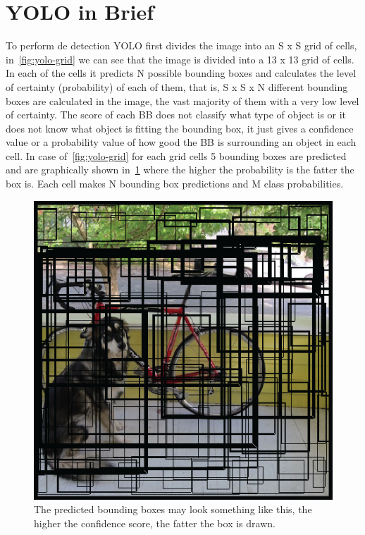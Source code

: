 \section{YOLO in Brief}
To perform de detection YOLO first divides the image into an S x S grid of cells, in~\ref{fig:yolo-grid} we can see that the image is divided into a 13 x 13 grid of cells. In each of the cells it predicts N possible bounding boxes and calculates the level of certainty (probability) of each of them, that is, S x S x N different bounding boxes are calculated in the image, the vast majority of them with a very low level of certainty. The score of each BB does not classify what type of object is or it does not know what object is fitting the bounding box, it just gives a confidence value or a probability value of how good the BB is surrounding an object in each cell. In case of~\ref{fig:yolo-grid} for each grid cells 5 bounding boxes are predicted and are graphically shown in~\ref{fig:yolo-grid-2} where the higher the probability is the fatter the box is. Each cell makes N bounding box predictions and M class probabilities. 

\begin{figure}[h]
    \centering
    \includegraphics[max width=\textwidth]{images/ours/yolo-grid-2.png}
   \caption[Predicted YOLO Bounding Boxes]{ The predicted bounding boxes may look something like this, the higher the confidence score, the fatter the box is drawn. }
    \label{fig:yolo-grid-2}
\end{figure}

